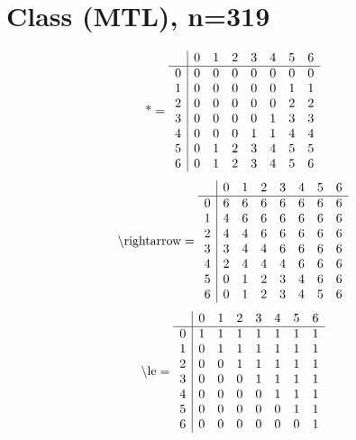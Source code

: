 \documentclass[11pt]{article}
\begin{document}
\section{Class (MTL), n=319}
\[\text{*} = 
\begin{array}{r | r r r r r r r}
 & 0 & 1 & 2 & 3 & 4 & 5 & 6 \\ \hline
0 & 0 & 0 & 0 & 0 & 0 & 0 & 0 \\
1 & 0 & 0 & 0 & 0 & 0 & 1 & 1 \\
2 & 0 & 0 & 0 & 0 & 0 & 2 & 2 \\
3 & 0 & 0 & 0 & 0 & 1 & 3 & 3 \\
4 & 0 & 0 & 0 & 1 & 1 & 4 & 4 \\
5 & 0 & 1 & 2 & 3 & 4 & 5 & 5 \\
6 & 0 & 1 & 2 & 3 & 4 & 5 & 6 \\
\end{array}
\]
\[\text{\textbackslash rightarrow} = 
\begin{array}{r | r r r r r r r}
 & 0 & 1 & 2 & 3 & 4 & 5 & 6 \\ \hline
0 & 6 & 6 & 6 & 6 & 6 & 6 & 6 \\
1 & 4 & 6 & 6 & 6 & 6 & 6 & 6 \\
2 & 4 & 4 & 6 & 6 & 6 & 6 & 6 \\
3 & 3 & 4 & 4 & 6 & 6 & 6 & 6 \\
4 & 2 & 4 & 4 & 4 & 6 & 6 & 6 \\
5 & 0 & 1 & 2 & 3 & 4 & 6 & 6 \\
6 & 0 & 1 & 2 & 3 & 4 & 5 & 6 \\
\end{array}
\]
\[\text{\textbackslash le} = 
\begin{array}{r | r r r r r r r}
 & 0 & 1 & 2 & 3 & 4 & 5 & 6 \\ \hline
0 & 1 & 1 & 1 & 1 & 1 & 1 & 1 \\
1 & 0 & 1 & 1 & 1 & 1 & 1 & 1 \\
2 & 0 & 0 & 1 & 1 & 1 & 1 & 1 \\
3 & 0 & 0 & 0 & 1 & 1 & 1 & 1 \\
4 & 0 & 0 & 0 & 0 & 1 & 1 & 1 \\
5 & 0 & 0 & 0 & 0 & 0 & 1 & 1 \\
6 & 0 & 0 & 0 & 0 & 0 & 0 & 1 \\
\end{array}
\]
\end{document}
